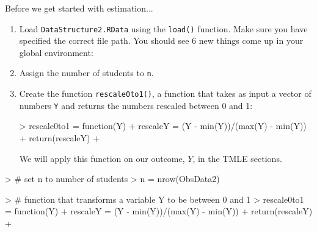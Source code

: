 \documentclass[answers]{exam}
\newenvironment{packed_item}{
\begin{itemize}
 \setlength{\itemsep}{0pt}
  \setlength{\parskip}{0pt}
  \setlength{\parsep}{0pt}
}{\end{itemize}}
\begin{document}
\noindent Before we get started with estimation...
\begin{enumerate}
\item Load \texttt{DataStructure2.RData} using the \texttt{load()} function. Make sure you have specified the correct file path. You should see 6 new things come up in your global environment:
  

\item Assign the number of students to \texttt{n}.
\item Create the function \texttt{rescale0to1()}, a function that takes as input a vector  of numbers \texttt{Y} and returns the numbers rescaled between 0 and 1:
\begin{Schunk}
\begin{Sinput}
> rescale0to1 = function(Y) {
+   rescaleY = (Y - min(Y))/(max(Y) - min(Y))
+   return(rescaleY)
+ }
\end{Sinput}
\end{Schunk}
We will apply this function on our outcome, $Y$, in the TMLE sections.
\end{enumerate}

\begin{solution}

\begin{Schunk}
\begin{Sinput}
> # set n to number of students
> n = nrow(ObsData2)
\end{Sinput}
\end{Schunk}
\begin{Schunk}
\begin{Sinput}
> # function that transforms a variable Y to be between 0 and 1
> rescale0to1 = function(Y) {
+   rescaleY = (Y - min(Y))/(max(Y) - min(Y))
+   return(rescaleY)
+ }
\end{Sinput}
\end{Schunk}
\end{solution}
\end{document}
